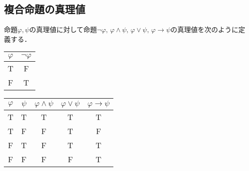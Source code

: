 \documentclass[10pt,b5paper,papersize,dvipdfmx]{jsbook}
\begin{document}
\subsection{複合命題の真理値}
命題$\varphi, \psi$の真理値に対して命題$\lnot\varphi,\, \varphi\land\psi,\, \varphi\lor\psi,\, \varphi\to\psi$の真理値を次のように定義する．\par
\begin{table}[H]
  \begin{minipage}[t]{.45\textwidth}
    \centering
    \begin{tabular}{c|c}\hline
      $\varphi$ & $\lnot\varphi$ \\ \hline
      T & F \\
      F & T \\ \hline
    \end{tabular}
  \end{minipage}
  \hfill
  \begin{minipage}[t]{.45\textwidth}
    \centering
    \begin{tabular}{cc|ccc}\hline
      $\varphi$ & $\psi$ & $\varphi\land\psi$ & $\varphi\lor\psi$ & $\varphi\to\psi$ \\ \hline
      T & T & T & T & T \\
      T & F & F & T & F \\
      F & T & F & T & T \\
      F & F & F & F & T \\ \hline
    \end{tabular}
  \end{minipage}
\end{table}
\end{document}
